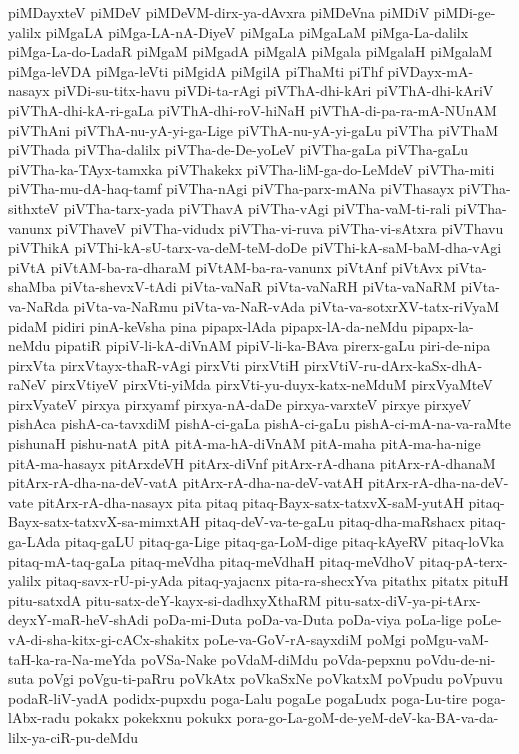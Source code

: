 {piMDayxteV
piMDeV
piMDeVM-dirx-ya-dAvxra
piMDeVna
piMDiV
piMDi-ge-yalilx
piMgaLA
piMga-LA-nA-DiyeV
piMgaLa
piMgaLaM
piMga-La-dalilx
piMga-La-do-LadaR
piMgaM
piMgadA
piMgalA
piMgala
piMgalaH
piMgalaM
piMga-leVDA
piMga-leVti
piMgidA
piMgilA
piThaMti
piThf
piVDayx-mA-nasayx
piVDi-su-titx-havu
piVDi-ta-rAgi
piVThA-dhi-kAri
piVThA-dhi-kAriV
piVThA-dhi-kA-ri-gaLa
piVThA-dhi-roV-hiNaH
piVThA-di-pa-ra-mA-NUnAM
piVThAni
piVThA-nu-yA-yi-ga-Lige
piVThA-nu-yA-yi-gaLu
piVTha
piVThaM
piVThada
piVTha-dalilx
piVTha-de-De-yoLeV
piVTha-gaLa
piVTha-gaLu
piVTha-ka-TAyx-tamxka
piVThakekx
piVTha-liM-ga-do-LeMdeV
piVTha-miti
piVTha-mu-dA-haq-tamf
piVTha-nAgi
piVTha-parx-mANa
piVThasayx
piVTha-sithxteV
piVTha-tarx-yada
piVThavA
piVTha-vAgi
piVTha-vaM-ti-rali
piVTha-vanunx
piVThaveV
piVTha-vidudx
piVTha-vi-ruva
piVTha-vi-sAtxra
piVThavu
piVThikA
piVThi-kA-sU-tarx-va-deM-teM-doDe
piVThi-kA-saM-baM-dha-vAgi
piVtA
piVtAM-ba-ra-dharaM
piVtAM-ba-ra-vanunx
piVtAnf
piVtAvx
piVta-shaMba
piVta-shevxV-tAdi
piVta-vaNaR
piVta-vaNaRH
piVta-vaNaRM
piVta-va-NaRda
piVta-va-NaRmu
piVta-va-NaR-vAda
piVta-va-sotxrXV-tatx-riVyaM
pidaM
pidiri
pinA-keVsha
pina
pipapx-lAda
pipapx-lA-da-neMdu
pipapx-la-neMdu
pipatiR
pipiV-li-kA-diVnAM
pipiV-li-ka-BAva
pirerx-gaLu
piri-de-nipa
pirxVta
pirxVtayx-thaR-vAgi
pirxVti
pirxVtiH
pirxVtiV-ru-dArx-kaSx-dhA-raNeV
pirxVtiyeV
pirxVti-yiMda
pirxVti-yu-duyx-katx-neMduM
pirxVyaMteV
pirxVyateV
pirxya
pirxyamf
pirxya-nA-daDe
pirxya-varxteV
pirxye
pirxyeV
pishAca
pishA-ca-tavxdiM
pishA-ci-gaLa
pishA-ci-gaLu
pishA-ci-mA-na-va-raMte
pishunaH
pishu-natA
pitA
pitA-ma-hA-diVnAM
pitA-maha
pitA-ma-ha-nige
pitA-ma-hasayx
pitArxdeVH
pitArx-diVnf
pitArx-rA-dhana
pitArx-rA-dhanaM
pitArx-rA-dha-na-deV-vatA
pitArx-rA-dha-na-deV-vatAH
pitArx-rA-dha-na-deV-vate
pitArx-rA-dha-nasayx
pita
pitaq
pitaq-Bayx-satx-tatxvX-saM-yutAH
pitaq-Bayx-satx-tatxvX-sa-mimxtAH
pitaq-deV-va-te-gaLu
pitaq-dha-maRshacx
pitaq-ga-LAda
pitaq-gaLU
pitaq-ga-Lige
pitaq-ga-LoM-dige
pitaq-kAyeRV
pitaq-loVka
pitaq-mA-taq-gaLa
pitaq-meVdha
pitaq-meVdhaH
pitaq-meVdhoV
pitaq-pA-terx-yalilx
pitaq-savx-rU-pi-yAda
pitaq-yajacnx
pita-ra-shecxYva
pitathx
pitatx
pituH
pitu-satxdA
pitu-satx-deY-kayx-si-dadhxyXthaRM
pitu-satx-diV-ya-pi-tArx-deyxY-maR-heV-shAdi
poDa-mi-Duta
poDa-va-Duta
poDa-viya
poLa-lige
poLe-vA-di-sha-kitx-gi-cACx-shakitx
poLe-va-GoV-rA-sayxdiM
poMgi
poMgu-vaM-taH-ka-ra-Na-meYda
poVSa-Nake
poVdaM-diMdu
poVda-pepxnu
poVdu-de-ni-suta
poVgi
poVgu-ti-paRru
poVkAtx
poVkaSxNe
poVkatxM
poVpudu
poVpuvu
podaR-liV-yadA
podidx-pupxdu
poga-Lalu
pogaLe
pogaLudx
poga-Lu-tire
poga-lAbx-radu
pokakx
pokekxnu
pokukx
pora-go-La-goM-de-yeM-deV-ka-BA-va-da-lilx-ya-ciR-pu-deMdu
}
